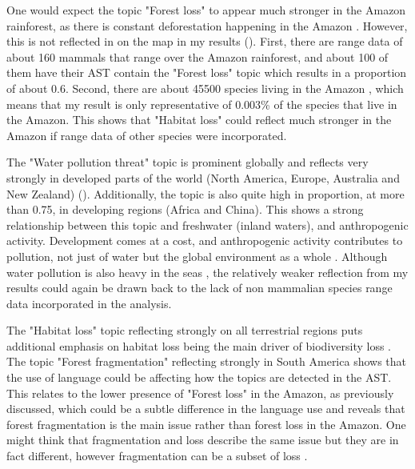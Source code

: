 One would expect the topic "Forest loss" to appear much stronger in the Amazon rainforest, as there is constant deforestation happening in the Amazon \parencite{Ellwanger2020BeyondDL,Escobar2020defor}. However, this is not reflected in on the map in my results (). First, there are range data of about 160 mammals that range over the Amazon rainforest, and about 100 of them have their AST contain the "Forest loss" topic which results in a proportion of about 0.6. Second, there are about 45500 species living in the Amazon \parencite{da2005fate}, which means that my result is only representative of 0.003\% of the species that live in the Amazon. This shows that "Habitat loss" could reflect much stronger in the Amazon if range data of other species were incorporated. 

The "Water pollution threat" topic is prominent globally and reflects very strongly in developed parts of the world (North America, Europe, Australia and New Zealand) (). Additionally, the topic is also quite high in proportion, at more than 0.75, in developing regions (Africa and China). This shows a strong relationship between this topic and freshwater (inland waters), and anthropogenic activity. Development comes at a cost, and anthropogenic activity contributes to pollution, not just of water \parencite{zhou2020e00925,emmanuel2016new} but the global environment as a whole \parencite{Brusseau2019TheEO}. Although water pollution is also heavy in the seas \parencite{Barrett2020MicroplasticPI,Zhang2020MicroplasticPI,Eriksen2014PlasticPI}, the relatively weaker reflection from my results could again be drawn back to the lack of non mammalian species range data incorporated in the analysis.

The "Habitat loss" topic reflecting strongly on all terrestrial regions puts additional emphasis on habitat loss being the main driver of biodiversity loss \parencite{diaz2019pervasive, pimm2014biodiversity}. The topic "Forest fragmentation" reflecting strongly in South America shows that the use of language could be affecting how the topics are detected in the AST. This relates to the lower presence of "Forest loss" in the Amazon, as previously discussed, which could be a subtle difference in the language use and reveals that forest fragmentation is the main issue rather than forest loss in the Amazon. One might think that fragmentation and loss describe the same issue but they are in fact different, however fragmentation can be a subset of loss \parencite{liu2016socioeconomic,fahrig2003effects}.

